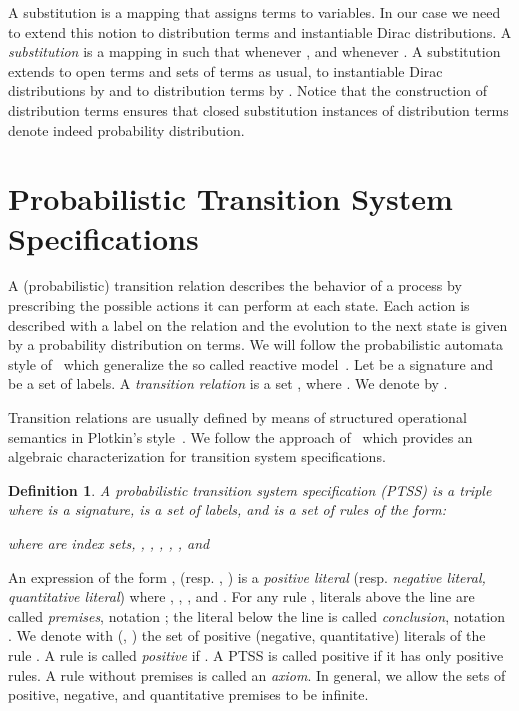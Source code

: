 \documentclass[submission,copyright,creativecommons]{eptcs}
\newtheorem{definition}{Definition}
\begin{document}
A substitution is a mapping that assigns terms to variables.  In our
case we need to extend this notion to distribution terms and
instantiable Dirac distributions.
A \emph{substitution}  is a mapping in  such that  whenever , and  whenever .
A substitution  extends to open terms and sets of terms as usual,
to instantiable Dirac distributions by  
and to distribution terms by 
. Notice that the construction of distribution terms ensures that closed substitution 
instances of distribution terms denote indeed probability distribution.


\section{Probabilistic Transition System Specifications}\label{sec:ptss}


A (probabilistic) transition relation describes the behavior of a
process by prescribing the possible actions it can perform at each
state.
Each action is described with a label on the relation and the
evolution to the next state is given by a probability distribution on
terms.
We will follow the probabilistic automata style of~\cite{Segala95} which generalize the so
called reactive model~\cite{LarsenSkou91}.  Let  be a
signature and  be a set of labels.  A \emph{transition relation}
is a set , where .  We denote 
by .

Transition relations are usually defined by means of structured
operational semantics in Plotkin's style~\cite{Plotkin81}. 
We follow the approach
of~\cite{GrooteVaandrager92,Groote93,BolGroote96} which provides an
algebraic characterization for transition system specifications.


\begin{definition}\label{def:ptss}A \emph{probabilistic transition system specification} (PTSS) is a
  triple  where  is a signature,
   is a set of labels, and  is a set of rules of the form:

where
 are index sets, 
, , 
  , ,
, 
and 
\end{definition}


An expression of the form , (resp. , ) is a \emph{positive literal} (resp. \emph{negative literal, quantitative literal})
where , , ,  and .
For any rule , literals above the line are called
\emph{premises}, notation ; the literal below the line is
called \emph{conclusion}, notation .
We denote with  (, ) the set of
positive (negative, quantitative) literals of the rule .
A rule  is called \emph{positive} if .  A PTSS is called positive if
it has only positive rules. A rule  without premises is called an
\emph{axiom}.
In general, we allow the sets of positive, negative, and quantitative premises to be infinite.
\end{document}
